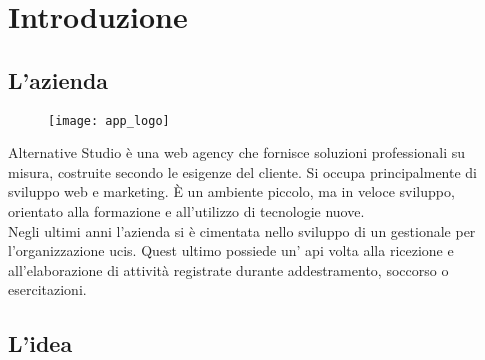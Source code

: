 
\chapter{Introduzione}
\label{cap:introduzione}


\section{L'azienda}

\begin{figure}[htbp]
\begin{center}
\texttt{[image: app\_logo]}
\end{center}
\end{figure}

Alternative Studio è una web agency che fornisce soluzioni professionali su misura, costruite secondo le esigenze del cliente. Si occupa principalmente di sviluppo web e marketing. È un ambiente piccolo, ma in veloce sviluppo, orientato alla formazione e all'utilizzo di tecnologie nuove. \\
Negli ultimi anni l'azienda si è cimentata nello sviluppo di un gestionale per l'organizzazione \gls{ucis}. Quest ultimo possiede un' \gls{api} volta alla ricezione e all'elaborazione di attività registrate durante addestramento, soccorso o esercitazioni.

\section{L'idea}

